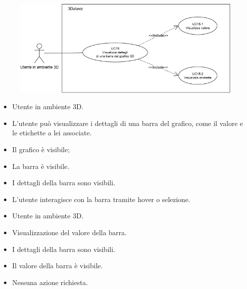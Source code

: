 \begin{figure}[H]\centering
    \includegraphics[scale=0.7]{template/images/UC15.png}
    \caption{}
\end{figure}
\UCdsc
{ %
    \begin{itemize}
        \item Utente in ambiente 3D.
    \end{itemize}
}
{ %
    \begin{itemize}
        \item L'utente può visualizzare i dettagli di una barra del grafico, come il valore e le etichette a lei associate.
    \end{itemize}
}
{ %
    \begin{itemize}
        \item Il grafico è visibile;
        \item La barra è visibile.
    \end{itemize}
}
{ %
    \begin{itemize}
        \item I dettagli della barra sono visibili.
    \end{itemize}
}
{ %
    \begin{itemize}
        \item L'utente interagisce con la barra tramite hover o selezione.
    \end{itemize}
}

\UCdsc
{ %
    \begin{itemize}
        \item Utente in ambiente 3D.
    \end{itemize}
}
{ %
    \begin{itemize}
        \item Visualizzazione del valore della barra.
    \end{itemize}
}
{ %
    \begin{itemize}
        \item I dettagli della barra sono visibili.
    \end{itemize}
}
{ %
    \begin{itemize}
        \item Il valore della barra è visibile.
    \end{itemize}
}
{ %
    \begin{itemize}
        \item Nessuna azione richiesta. 
    \end{itemize}
}

